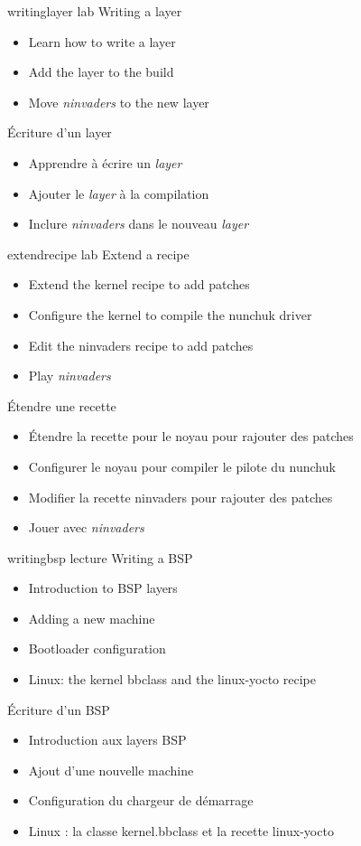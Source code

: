 {writinglayer}
{lab}
{Writing a layer}
{
  \begin{itemize}
  \item Learn how to write a layer
  \item Add the layer to the build
  \item Move {\em ninvaders} to the new layer
  \end{itemize}
}
{Écriture d'un layer}
{
  \begin{itemize}
  \item Apprendre à écrire un {\em layer}
  \item Ajouter le {\em layer} à la compilation
  \item Inclure {\em ninvaders} dans le nouveau {\em layer}
  \end{itemize}
}

{extendrecipe}
{lab}
{Extend a recipe}
{
  \begin{itemize}
  \item Extend the kernel recipe to add patches
  \item Configure the kernel to compile the nunchuk driver
  \item Edit the ninvaders recipe to add patches
  \item Play {\em ninvaders}
  \end{itemize}
}
{Étendre une recette}
{
  \begin{itemize}
  \item Étendre la recette pour le noyau pour rajouter des patches
  \item Configurer le noyau pour compiler le pilote du nunchuk
  \item Modifier la recette ninvaders pour rajouter des patches
  \item Jouer avec {\em ninvaders}
  \end{itemize}
}

{writingbsp}
{lecture}
{Writing a BSP}
{
  \begin{itemize}
  \item Introduction to BSP layers
  \item Adding a new machine
  \item Bootloader configuration
  \item Linux: the kernel bbclass and the linux-yocto recipe
  \end{itemize}
}
{Écriture d'un BSP}
{
  \begin{itemize}
  \item Introduction aux layers BSP
  \item Ajout d'une nouvelle machine
  \item Configuration du chargeur de démarrage
  \item Linux : la classe kernel.bbclass et la recette linux-yocto
  \end{itemize}
}

